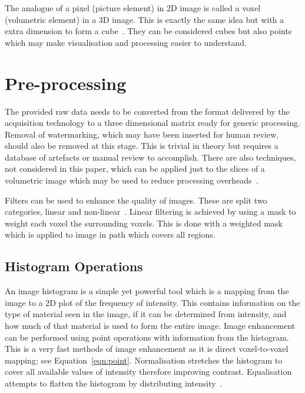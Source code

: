 \documentclass[journal]{IEEEtran}
\begin{document}
The analogue of a pixel (picture element) in 2D image is called a voxel (volumetric element) in a 3D image.
This is exactly the same idea but with a extra dimension to form a cube~\cite{lohmann1998volumetric}.
They can be considered cubes but also points which may make visualisation and processing easier to understand.










\section{Pre-processing}
\label{sec:pre}

The provided raw data needs to be converted from the format delivered by the acquisition technology to a three dimensional matrix ready for generic processing.
Removal of watermarking, which may have been inserted for human review, should also be removed at this stage. 
This is trivial in theory but requires a database of artefacts or manual review to accomplish.
There are also techniques, not considered in this paper, which can be applied just to the slices of a volumetric image which may be used to reduce processing overheads~\cite{harauz86exact}.

Filters can be used to enhance the quality of images.
These are split two categories, linear and non-linear~\cite{lohmann1998volumetric}.
Linear filtering is achieved by using a mask to weight each voxel the surrounding voxels.
This is done with a weighted mask which is applied to image in path which covers all regions.


\subsection{Histogram Operations}

An image histogram is a simple yet powerful tool which is a mapping from the image to a 2D plot of the frequency of intensity.
This contains information on the type of material seen in the image, if it can be determined from intensity, and how much of that material is used to form the entire image.
Image enhancement can be performed using point operations with information from the histogram.
This is a very fast methods of image enhancement as it is direct voxel-to-voxel mapping; see Equation~\ref{eqn:point}. 
Normalisation stretches the histogram to cover all available values of intensity therefore improving contrast.
Equalisation attempts to flatten the histogram by distributing intensity~\cite{nixon02feature}.
\end{document}
